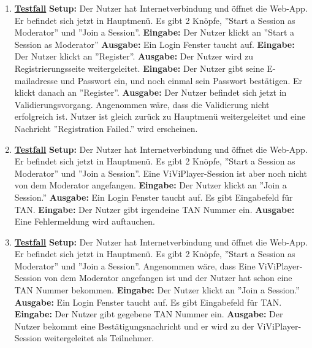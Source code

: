 \begin{enumerate}
	\item \underline{\textbf{Testfall}} \linebreak
	\textbf{Setup:} Der Nutzer hat Internetverbindung und öffnet die Web-App. Er befindet sich jetzt in Hauptmenü. Es gibt 2 Knöpfe, ''Start a Session as Moderator'' und ''Join a Session''. \linebreak
	\textbf{Eingabe:} Der Nutzer klickt an ''Start a Session as Moderator'' \linebreak
	\textbf{Ausgabe:} Ein Login Fenster taucht auf.\linebreak
	\textbf{Eingabe:} Der Nutzer klickt an ''Register''.\linebreak
	\textbf{Ausgabe:} Der Nutzer wird zu Registrierungsseite weitergeleitet.\linebreak
	\textbf{Eingabe:} Der Nutzer gibt seine E-mailadresse und Passwort ein, und noch einmal sein Passwort bestätigen. Er klickt danach an ''Register''. \linebreak
	\textbf{Ausgabe:} Der Nutzer befindet sich jetzt in Validierungsvorgang. Angenommen wäre, dass die Validierung nicht erfolgreich ist. Nutzer ist gleich zurück zu Hauptmenü weitergeleitet und eine Nachricht ''Registration Failed.'' wird erscheinen.
	
	\item \underline{\textbf{Testfall}} \linebreak
	\textbf{Setup:} Der Nutzer hat Internetverbindung und öffnet die Web-App. Er befindet sich jetzt in Hauptmenü. Es gibt 2 Knöpfe, ''Start a Session as Moderator'' und ''Join a Session''.
	Eine ViViPlayer-Session ist aber noch nicht von dem Moderator angefangen. \linebreak
	\textbf{Eingabe:} Der Nutzer klickt an ''Join a Session.'' \linebreak
	\textbf{Ausgabe:} Ein Login Fenster taucht auf. Es gibt Eingabefeld für TAN.\linebreak
	\textbf{Eingabe:} Der Nutzer gibt irgendeine TAN Nummer ein. \linebreak
	\textbf{Ausgabe:} Eine Fehlermeldung wird auftauchen.
	
	\item \underline{\textbf{Testfall}} \linebreak
	\textbf{Setup:} Der Nutzer hat Internetverbindung und öffnet die Web-App. Er befindet sich jetzt in Hauptmenü. Es gibt 2 Knöpfe, ''Start a Session as Moderator'' und ''Join a Session''. Angenommen wäre, dass Eine ViViPlayer-Session von dem Moderator angefangen ist und der Nutzer hat schon eine TAN Nummer bekommen. \linebreak
	\textbf{Eingabe:} Der Nutzer klickt an ''Join a Session.'' \linebreak
	\textbf{Ausgabe:} Ein Login Fenster taucht auf. Es gibt Eingabefeld für TAN.\linebreak
	\textbf{Eingabe:} Der Nutzer gibt gegebene TAN Nummer ein. \linebreak
	\textbf{Ausgabe:} Der Nutzer bekommt eine Bestätigungsnachricht und er wird zu der ViViPlayer-Session weitergeleitet als Teilnehmer.
	

\end{enumerate}
